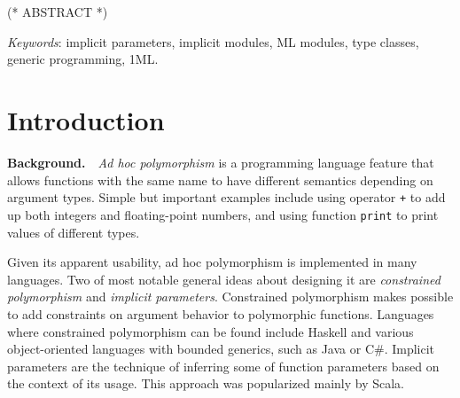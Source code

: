 \documentclass{spbau-diploma}
\begin{document}
\maketitle
\tableofcontents
\section*{}

(* ABSTRACT *)

\textit{Keywords}: implicit parameters, implicit modules, ML modules, type classes, generic programming, 1ML.

\section{Introduction}

\textbf{Background.}~~\textit{Ad hoc polymorphism} is a programming language feature that allows functions with the same name to have different semantics depending on argument types. Simple but important examples include using operator \texttt{+} to add up both integers and floating-point numbers, and using function \texttt{print} to print values of different types.

Given its apparent usability, ad hoc polymorphism is implemented in many languages. Two of most notable general ideas about designing it are \textit{constrained polymorphism} and \textit{implicit parameters}. Constrained polymorphism makes possible to add constraints on argument behavior to polymorphic functions. Languages where constrained polymorphism can be found include Haskell and various object-oriented languages with bounded generics, such as Java or C\#. Implicit parameters are the technique of inferring some of function parameters based on the context of its usage. This approach was popularized mainly by Scala.
\end{document}
